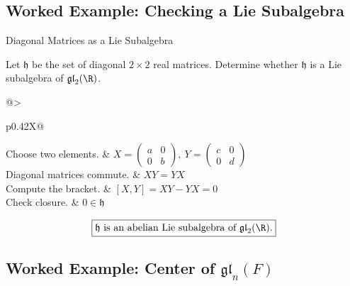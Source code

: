 \subsection{Worked Example: Checking a Lie Subalgebra}
\label{subsec:worked-lie-subalgebra}

\begin{workedexamplebox}{Diagonal Matrices as a Lie Subalgebra}

Let \(\mathfrak h\) be the set of diagonal \(2\times2\) real matrices.
Determine whether \(\mathfrak h\) is a Lie subalgebra of
\(\mathfrak{gl}_2(\R)\).

\begin{tabularx}{\textwidth}{@{}>{\raggedright\arraybackslash}p{}X@{}}
Choose two elements. &
\(\displaystyle X=\begin{pmatrix}a&0\\0&b\end{pmatrix},\
Y=\begin{pmatrix}c&0\\0&d\end{pmatrix}\)\\
Diagonal matrices commute. & \(XY=YX\)\\
Compute the bracket. & \([X,Y]=XY-YX=0\)\\
Check closure. & \(0\in\mathfrak h\)
\end{tabularx}

\begin{answerbox}
\[ \boxed{\mathfrak h\text{ is an abelian Lie subalgebra of }
\mathfrak{gl}_2(\R).} \]
\end{answerbox}
\end{workedexamplebox}

\subsection{Worked Example: Center of \(\mathfrak{gl}_n(F)\)}
\label{subsec:worked-center-gln}

